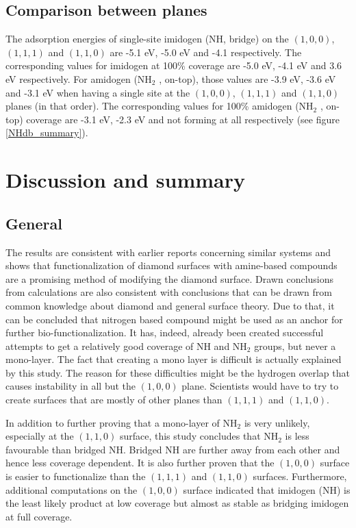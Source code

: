 \documentclass[10pt,a4paper]{article}
\begin{document}
\subsection{Comparison between planes}
The adsorption energies of single-site imidogen (NH, bridge) on the $(1,  0,  0)$, $(1,  1, 1)$ and $(1,  1,  0)$ are -5.1 eV, -5.0 eV and -4.1 respectively. The corresponding values for imidogen at 100\% coverage are -5.0 eV, -4.1 eV and 3.6 eV respectively. For amidogen (NH$_2$ , on-top), those values are -3.9 eV, -3.6 eV and -3.1 eV when having a single site at the $(1,  0,  0)$, $(1,  1, 1)$ and $(1,  1,  0)$ planes (in that order). The corresponding values for 100\% amidogen (NH$_2$ , on-top) coverage are -3.1 eV, -2.3 eV and not forming at all respectively (see figure \ref{NHdb_summary}).

\section{Discussion and summary}
\subsection{General}
The results are consistent with earlier reports concerning similar systems and shows that functionalization of diamond surfaces with amine-based compounds are a promising method of modifying the diamond surface. Drawn conclusions from calculations are also consistent with conclusions that can be drawn from common knowledge about diamond and general surface theory. Due to that, it can be concluded that nitrogen based compound might be used as an anchor for further bio-functionalization. It has, indeed, already been created successful attempts to get a relatively good coverage of NH and NH$_2$ groups, but never a mono-layer. The fact that creating a mono layer is difficult is actually explained by this study. The reason for these difficulties might be the hydrogen overlap that causes instability in all but the $(1,  0,  0)$ plane. Scientists would have to try to create surfaces that are mostly of other planes than $(1,  1, 1)$ and $(1,  1,  0)$. 

In addition to further proving that a mono-layer of NH$_2$ is very unlikely, especially at the $(1,  1,  0)$ surface, this study concludes that NH$_2$ is less favourable than bridged NH. Bridged NH are further away from each other and hence less coverage dependent. It is also further proven that the $(1,  0,  0)$ surface is easier to functionalize than the $(1,  1, 1)$ and $(1,  1,  0)$ surfaces. Furthermore, additional computations on the $(1,  0,  0)$ surface indicated that imidogen (NH) is the least likely product at low coverage but almost as stable as bridging imidogen at full coverage. 
\end{document}
